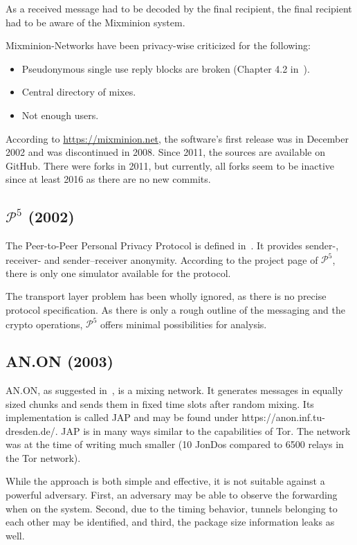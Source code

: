 As a received message had to be decoded by the final recipient, the final recipient had to be aware of the Mixminion system.

Mixminion-Networks have been privacy-wise criticized for the following: 
\begin{itemize}
	\item Pseudonymous single use reply blocks are broken (Chapter 4.2 in~\cite{sassamanpynchon}).
	\item Central directory of mixes.
	\item Not enough users.
\end{itemize}

According to \url{https://mixminion.net}, the software's first release was in December 2002 and was discontinued in 2008. Since 2011, the sources are available on GitHub. There were forks in 2011, but currently, all forks seem to be inactive since at least 2016 as there are no new commits.

\subsection{\texorpdfstring{$\mathcal{P}^5$}{P5} (2002)}
The Peer-to-Peer Personal Privacy Protocol is defined in~\cite{sherwood-protocol}. It provides sender-, receiver- and sender--receiver anonymity. According to the project page of $\mathcal{P}^5$, there is only one simulator available for the protocol.

The transport layer problem has been wholly ignored, as there is no precise protocol specification. As there is only a rough outline of the messaging and the crypto operations, $\mathcal{P}^5$ offers minimal possibilities for analysis.

\subsection{AN.ON (2003)}
AN.ON, as suggested in~\cite{federrath2003system}, is a mixing network. It generates messages in equally sized chunks and sends them in fixed time slots after random mixing. Its implementation is called JAP and may be found under https://anon.inf.tu-dresden.de/. JAP is in many ways similar to the capabilities of Tor. The network was at the time of writing much smaller (10 JonDos compared to 6500 relays in the Tor network).

While the approach is both simple and effective, it is not suitable against a powerful adversary. First, an adversary may be able to observe the forwarding when on the system. Second, due to the timing behavior, tunnels belonging to each other may be identified, and third, the package size information leaks as well.

